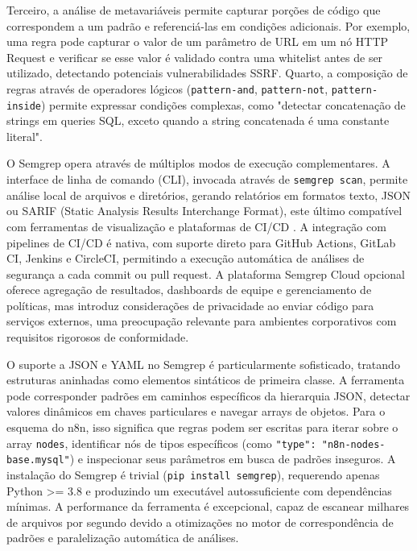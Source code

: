 \documentclass{sftex}
\begin{document}
Terceiro, a análise de metavariáveis permite capturar porções de código que correspondem a um padrão e referenciá-las em condições adicionais. Por exemplo, uma regra pode capturar o valor de um parâmetro de URL em um nó HTTP Request e verificar se esse valor é validado contra uma whitelist antes de ser utilizado, detectando potenciais vulnerabilidades SSRF. Quarto, a composição de regras através de operadores lógicos (\texttt{pattern-and}, \texttt{pattern-not}, \texttt{pattern-inside}) permite expressar condições complexas, como "detectar concatenação de strings em queries SQL, exceto quando a string concatenada é uma constante literal".

O Semgrep opera através de múltiplos modos de execução complementares. A interface de linha de comando (CLI), invocada através de \texttt{semgrep scan}, permite análise local de arquivos e diretórios, gerando relatórios em formatos texto, JSON ou SARIF (Static Analysis Results Interchange Format), este último compatível com ferramentas de visualização e plataformas de CI/CD \cite{owasp_source_code_analysis}. A integração com pipelines de CI/CD é nativa, com suporte direto para GitHub Actions, GitLab CI, Jenkins e CircleCI, permitindo a execução automática de análises de segurança a cada commit ou pull request. A plataforma Semgrep Cloud opcional oferece agregação de resultados, dashboards de equipe e gerenciamento de políticas, mas introduz considerações de privacidade ao enviar código para serviços externos, uma preocupação relevante para ambientes corporativos com requisitos rigorosos de conformidade.

O suporte a JSON e YAML no Semgrep é particularmente sofisticado, tratando estruturas aninhadas como elementos sintáticos de primeira classe. A ferramenta pode corresponder padrões em caminhos específicos da hierarquia JSON, detectar valores dinâmicos em chaves particulares e navegar arrays de objetos. Para o esquema do n8n, isso significa que regras podem ser escritas para iterar sobre o array \texttt{nodes}, identificar nós de tipos específicos (como \texttt{"type": "n8n-nodes-base.mysql"}) e inspecionar seus parâmetros em busca de padrões inseguros. A instalação do Semgrep é trivial (\texttt{pip install semgrep}), requerendo apenas Python >= 3.8 e produzindo um executável autossuficiente com dependências mínimas. A performance da ferramenta é excepcional, capaz de escanear milhares de arquivos por segundo devido a otimizações no motor de correspondência de padrões e paralelização automática de análises.
\end{document}
